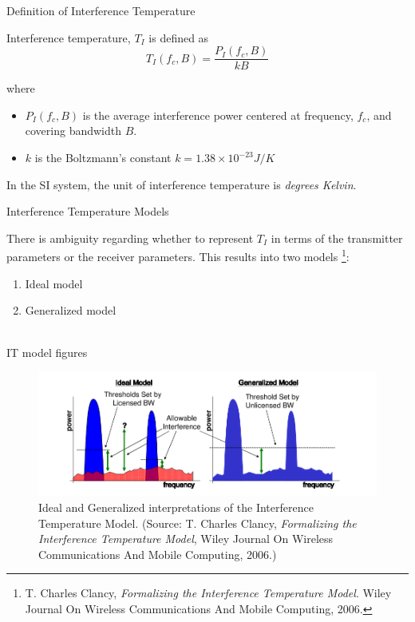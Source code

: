 \documentclass[mathserif]{beamer}
\begin{document}
\begin{frame}{Definition of Interference Temperature}

Interference temperature, $T_I$ is defined as
\begin{equation*} 
    T_I(f_c , B) = \frac{P_I(f_c , B)}{kB}
\end{equation*}

where 

\begin{itemize}
	\item $P_I(f_c,B)$ is the average interference power centered at frequency, $f_c$, and covering bandwidth
$B$. 
	\item $k$ is the Boltzmann's constant $k = 1.38 \times 10^{-23} J/K $ 
\end{itemize}

\pause
In the SI system, the unit of interference temperature is \emph{degrees Kelvin}.

\end{frame}



\begin{frame}{Interference Temperature Models}

There is ambiguity regarding whether to represent $T_I$ in terms of the transmitter parameters or the receiver parameters. This results into two models \footnote{T. Charles Clancy, \emph{Formalizing the Interference Temperature Model}. Wiley Journal On Wireless Communications And Mobile Computing, 2006.}:

\pause
\begin{enumerate}
    \item Ideal model
    \item Generalized model \\~\\
\end{enumerate}
\end{frame}



\begin{frame}{IT model figures}

\begin{figure}[p]
\centering
\includegraphics[width = \linewidth]{interferenceTemperatureModels.png}
\caption{Ideal and Generalized interpretations of the Interference Temperature Model. (Source: T. Charles Clancy, \emph{Formalizing the Interference Temperature Model}, Wiley Journal On Wireless Communications And Mobile Computing, 2006.)}
\end{figure}

\end{frame}
\end{document}
